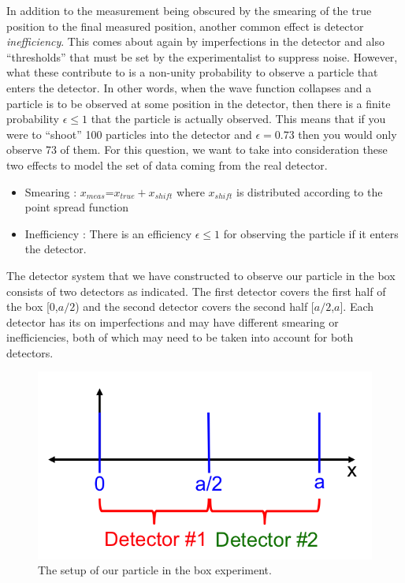 \documentclass[12pt]{article}
\begin{document}
\newline
\newline
In addition to the measurement being obscured by the smearing of the true position to the final measured position, another common effect is detector \textit{inefficiency}.  This comes about again by imperfections in the detector and also ``thresholds'' that must be set by the experimentalist to suppress noise.  However, what these contribute to is a non-unity probability to observe a particle that enters the detector.  In other words, when the wave function collapses and a particle is to be observed at some position in the detector, then there is a finite probability $\epsilon\leq 1$ that the particle is actually observed.  This means that if you were to ``shoot'' 100 particles into the detector and $\epsilon=0.73$ then you would only observe 73 of them.  
\newline
\newline
For this question, we want to take into consideration these two effects to model the set of data coming from the real detector.  
\begin{itemize}[noitemsep]
\item Smearing : $x_{meas}$=$x_{true}+x_{shift}$ where $x_{shift}$ is distributed according to the point spread function
\item Inefficiency : There is an efficiency $\epsilon\leq 1$ for observing the particle if it enters the detector.  
\end{itemize}
The detector system that we have constructed to observe our particle in the box consists of two detectors as indicated.  The first detector covers the first half of the box [0,$a/2$) and the second detector covers the second half [$a/2$,$a$].  Each detector has its on imperfections and may have different smearing or inefficiencies, both of which may need to be taken into account for both detectors.
\begin{figure}[h!]
  \center
  \includegraphics[width=0.4\linewidth]{setup.png}
  \caption{The setup of our particle in the box experiment.}
  \label{fig:riemann}
\end{figure}
\newline
\newline
\end{document}
